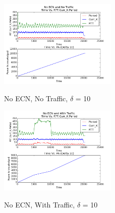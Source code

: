 \begin{figure}[htb]
  \begin{center}

    \includegraphics[width=0.50\textwidth]{Figures/iccps2014/no_ecn_no_tr_d10.png}
  \caption{No ECN, No Traffic, $\delta$ = 10}
  \label{fig:no_ecn_no_tr_d10}
    \includegraphics[width=0.50\textwidth]{Figures/iccps2014/no_ecn_w_tr_d10.png}
  \caption{No ECN, With Traffic, $\delta$ = 10}
  \label{fig:no_ecn_w_tr_d10}

  \end{center}
\end{figure}
